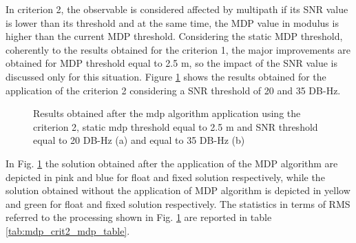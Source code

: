 In criterion 2, the observable is considered affected by multipath if its SNR value is lower than its threshold and at the same time, the MDP value in modulus is higher than the current MDP threshold. Considering the static MDP threshold, coherently to the results obtained for the criterion 1, the major improvements are obtained for MDP threshold equal to 2.5 m, so the impact of the SNR value is discussed only for this situation. Figure \ref{FIG:test4mdp_crit2mdpstatic} shows the results obtained for the application of the criterion 2 considering a SNR threshold of 20 and 35 DB-Hz.

\begin{figure}[H] 
	\centering
    \caption{Results obtained after the mdp algorithm application using the criterion 2, static mdp threshold equal to 2.5 m and SNR threshold equal to 20 DB-Hz (a) and equal to 35 DB-Hz (b)}
	\label{FIG:test4mdp_crit2mdpstatic} 
\end{figure}
In Fig. \ref{FIG:test4mdp_crit2mdpstatic} the solution obtained after the application of the MDP algorithm are depicted in pink and
blue for float and fixed solution respectively, while the solution obtained without the application of MDP algorithm is depicted in yellow and green for float and fixed solution respectively. The statistics in terms of RMS referred to the processing shown in Fig. \ref{FIG:test4mdp_crit2mdpstatic} are reported in table \ref{tab:mdp_crit2_mdp_table}.

